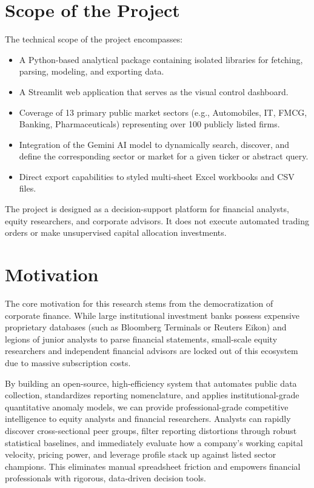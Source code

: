 \section{Scope of the Project}
The technical scope of the project encompasses:
\begin{itemize}
    \item A Python-based analytical package containing isolated libraries for fetching, parsing, modeling, and exporting data.
    \item A Streamlit web application that serves as the visual control dashboard.
    \item Coverage of 13 primary public market sectors (e.g., Automobiles, IT, FMCG, Banking, Pharmaceuticals) representing over 100 publicly listed firms.
    \item Integration of the Gemini AI model to dynamically search, discover, and define the corresponding sector or market for a given ticker or abstract query.
    \item Direct export capabilities to styled multi-sheet Excel workbooks and CSV files.
\end{itemize}

The project is designed as a decision-support platform for financial analysts, equity researchers, and corporate advisors. It does not execute automated trading orders or make unsupervised capital allocation investments.

\section{Motivation}
The core motivation for this research stems from the democratization of corporate finance. While large institutional investment banks possess expensive proprietary databases (such as Bloomberg Terminals or Reuters Eikon) and legions of junior analysts to parse financial statements, small-scale equity researchers and independent financial advisors are locked out of this ecosystem due to massive subscription costs. 

By building an open-source, high-efficiency system that automates public data collection, standardizes reporting nomenclature, and applies institutional-grade quantitative anomaly models, we can provide professional-grade competitive intelligence to equity analysts and financial researchers. Analysts can rapidly discover cross-sectional peer groups, filter reporting distortions through robust statistical baselines, and immediately evaluate how a company's working capital velocity, pricing power, and leverage profile stack up against listed sector champions. This eliminates manual spreadsheet friction and empowers financial professionals with rigorous, data-driven decision tools.
